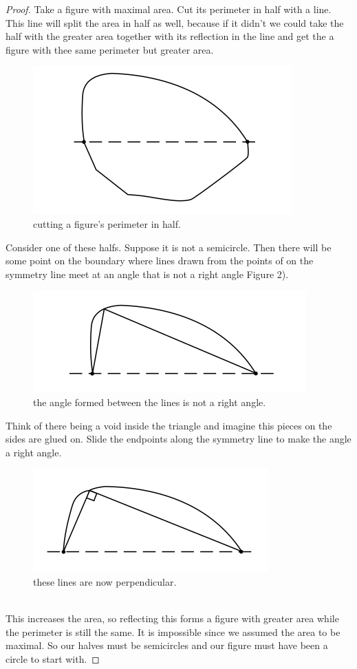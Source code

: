 \documentclass[12pt, a4paper, titlepage]{article}
\begin{document}
\begin{proof}
Take a figure with maximal area. Cut its perimeter in half with a line. This line will split the area in half as well, because if it didn't we could take the half with the greater area together with its reflection in the line and get the a figure with thee same perimeter but greater area.\\
\begin{figure}[htbp] \label{fig:c1}
\centering
\includegraphics[scale=0.5]{images/Figure1}
\caption{cutting a figure's perimeter in half.}
\end{figure}

Consider one of these halfs. Suppose it is not a semicircle. Then there will be some point on the boundary where lines drawn from the points of on the symmetry line meet at an angle that is not a right angle Figure 2).\\
\begin{figure}[htbp] \label{fig:c2}
\centering
\includegraphics[scale=0.5]{images/Figure2}
\caption{the angle formed between the lines is not a right angle.}
\end{figure}
\newpage
Think of there being a void inside the triangle and imagine this pieces on the sides are glued on. Slide the endpoints along the symmetry line to make the angle a right angle.
\begin{figure}[htbp] \label{fig:c3}
\centering
\includegraphics[scale=0.5]{images/Figure3}
\caption{these lines are now perpendicular.}
\end{figure}
\\
This increases the area, so reflecting this forms a figure with greater area while the perimeter is still the same. It is impossible since we assumed the area to be maximal. So our halves must be semicircles and our figure must have been a circle to start with.
\end{proof}
\end{document}
